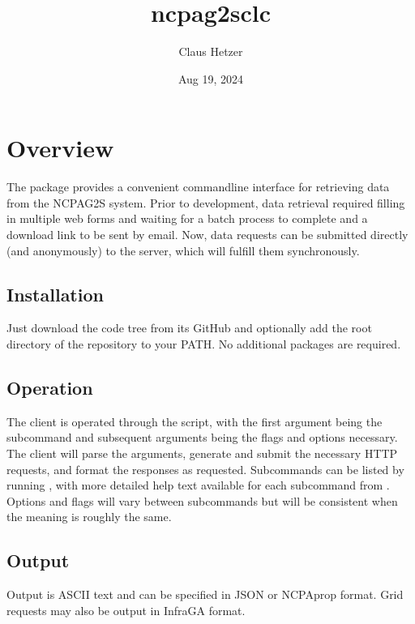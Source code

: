 \documentclass[letterpaper,10pt,english]{sphinxmanual}
\title{ncpag2s\sphinxhyphen{}clc}
\date{Aug 19, 2024}
\author{Claus Hetzer}
\begin{document}
\pagestyle{empty}
\sphinxmaketitle
\pagestyle{plain}
\sphinxtableofcontents
\pagestyle{normal}
\label{\detokenize{index::doc}}



\chapter{Overview}
\label{\detokenize{overview:overview}}\label{\detokenize{overview:id1}}\label{\detokenize{overview::doc}}
\sphinxAtStartPar
The  package provides a convenient command\sphinxhyphen{}line interface for retrieving data from the NCPA\sphinxhyphen{}G2S system.  Prior to development, data retrieval required filling in multiple web forms and waiting for a batch process to complete and a download link to be sent by email.  Now, data requests can be submitted directly (and anonymously) to the server, which will fulfill them synchronously.


\section{Installation}
\label{\detokenize{overview:installation}}
\sphinxAtStartPar
Just download the code tree from its GitHub  and optionally add the root directory of the repository to your PATH. No additional packages are required.


\section{Operation}
\label{\detokenize{overview:operation}}
\sphinxAtStartPar
The client is operated through the  script, with the first argument being the subcommand and subsequent arguments being the flags and options necessary. The client will parse the arguments, generate and submit the necessary HTTP requests, and format the responses as requested.  Subcommands can be listed by running , with more detailed help text available for each subcommand from .  Options and flags will vary between subcommands but will be consistent when the meaning is roughly the same.


\section{Output}
\label{\detokenize{overview:output}}
\sphinxAtStartPar
Output is ASCII text and can be specified in JSON or NCPAprop format.  Grid requests may also be output in InfraGA format.
\end{document}
